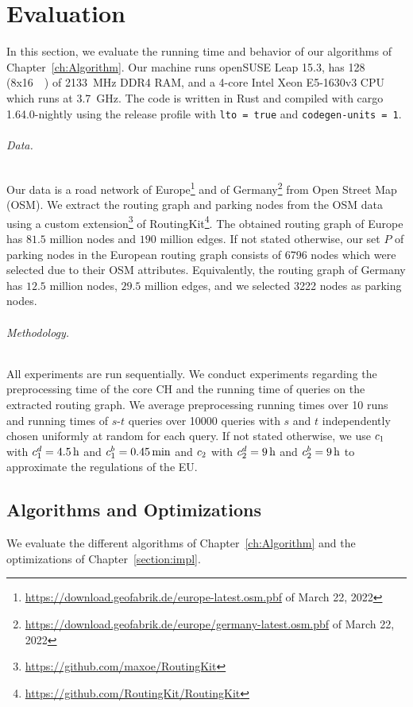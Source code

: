 
\chapter{Evaluation\label{ch:Evaluation}}
In this section, we evaluate the running time and behavior of our algorithms of Chapter~\ref{ch:Algorithm}. Our machine runs openSUSE Leap 15.3, has \SI{128}{\giga\byte} (8x\SI{16}{\giga\byte}) of \SI{2133}{\mega\hertz} DDR4 RAM, and a 4-core Intel Xeon E5-1630v3 CPU which runs at \SI{3.7}{\giga\hertz}. The code is written in Rust and compiled with cargo 1.64.0-nightly using the release profile with \texttt{lto~=~true} and \texttt{codegen-units~=~1}.

\subparagraph{Data.} Our data is a road network of Europe\footnote{\url{https://download.geofabrik.de/europe-latest.osm.pbf} of March 22, 2022} and of Germany\footnote{\url{https://download.geofabrik.de/europe/germany-latest.osm.pbf} of March 22, 2022} from Open Street Map (OSM). We extract the routing graph and parking nodes from the OSM data using a custom extension\footnote{\url{https://github.com/maxoe/RoutingKit}} of RoutingKit\footnote{\url{https://github.com/RoutingKit/RoutingKit}}. The obtained routing graph of Europe has $81.5$ million nodes and $190$ million edges. If not stated otherwise, our set $P$ of parking nodes in the European routing graph consists of \num{6796} nodes which were selected due to their OSM attributes. Equivalently, the routing graph of Germany has $12.5$ million nodes, $29.5$ million edges, and we selected \num{3222} nodes as parking nodes.

\subparagraph{Methodology.} All experiments are run sequentially. We conduct experiments regarding the preprocessing time of the core CH and the running time of queries on the extracted routing graph. We average preprocessing running times over \num{10} runs and running times of $s$-$t$ queries over \num{10000} queries with $s$ and $t$ independently chosen uniformly at random for each query. If not stated otherwise, we use $c_1$ with $c_1^d = \SI{4.5}{\hour}$ and $c_1^b = \SI{0.45}{\minute}$ and $c_2$ with $c_2^d = \SI{9}{\hour}$ and $c_2^b = \SI{9}{\hour}$ to approximate the regulations of the EU.

\section{Algorithms and Optimizations}
We evaluate the different algorithms of Chapter~\ref{ch:Algorithm} and the optimizations of Chapter~\ref{section:impl}.

